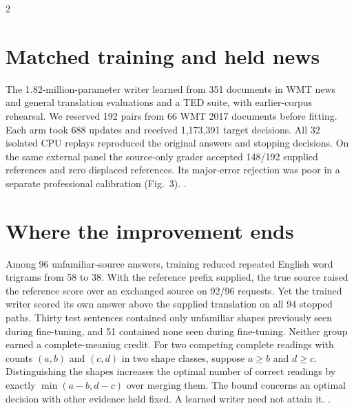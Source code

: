 \begin{multicols}{2}
\section*{Matched training and held news}
The 1.82-million-parameter writer learned from 351 documents in WMT news and general translation evaluations and a TED suite, with earlier-corpus rehearsal. We reserved 192 pairs from 66 WMT 2017 documents before fitting. Each arm took 688 updates and received 1,173,391 target decisions. All 32 isolated CPU replays reproduced the original answers and stopping decisions. On the same external panel the source-only grader accepted 148/192 supplied references and zero displaced references. Its major-error rejection was poor in a separate professional calibration (Fig.~3). .
\section*{Where the improvement ends}
Among 96 unfamiliar-source answers, training reduced repeated English word trigrams from 58 to 38. With the reference prefix supplied, the true source raised the reference score over an exchanged source on 92/96 requests. Yet the trained writer scored its own answer above the supplied translation on all 94 stopped paths. Thirty test sentences contained only unfamiliar shapes previously seen during fine-tuning, and 51 contained none seen during fine-tuning. Neither group earned a complete-meaning credit.
For two competing complete readings with counts $(a,b)$ and $(c,d)$ in two shape classes, suppose $a\ge b$ and $d\ge c$. Distinguishing the shapes increases the optimal number of correct readings by exactly $\min(a-b,d-c)$ over merging them. The bound concerns an optimal decision with other evidence held fixed. A learned writer need not attain it. .
\end{multicols}
